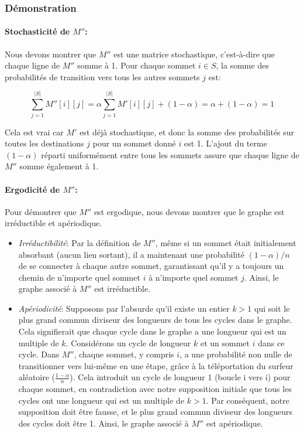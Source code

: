 \subsubsection{Démonstration}

\paragraph{Stochasticité de $M''$:} Nous devons montrer que $M''$ est une matrice stochastique, c'est-à-dire que chaque ligne de $M''$ somme à 1. Pour chaque sommet $i \in S$, la somme des probabilités de transition vers tous les autres sommets $j$ est:

\[
\sum_{j=1}^{|S|} M''[i][j] = \alpha \sum_{j=1}^{|S|} M'[i][j] + (1-\alpha) = \alpha + (1-\alpha) = 1
\]

Cela est vrai car $M'$ est déjà stochastique, et donc la somme des probabilités sur toutes les destinations $j$ pour un sommet donné $i$ est 1. L'ajout du terme $(1-\alpha)$ réparti uniformément entre tous les sommets assure que chaque ligne de $M''$ somme également à 1.

\paragraph{Ergodicité de $M''$:} Pour démontrer que $M''$ est ergodique, nous devons montrer que le graphe est irréductible et apériodique.

\begin{itemize}
    \item \textit{Irréductibilité}: Par la définition de $M''$, même si un sommet était initialement absorbant (aucun lien sortant), il a maintenant une probabilité $(1-\alpha)/n$ de se connecter à chaque autre sommet, garantissant qu'il y a toujours un chemin de n'importe quel sommet $i$ à n'importe quel sommet $j$. Ainsi, le graphe associé à $M''$ est irréductible.
    
    \item \textit{Apériodicité}: Supposons par l'absurde qu'il existe un entier $k > 1$ qui soit le plus grand commun diviseur des longueurs de tous les cycles dans le graphe. Cela signifierait que chaque cycle dans le graphe a une longueur qui est un multiple de $k$. Considérons un cycle de longueur $k$ et un sommet $i$ dans ce cycle. Dans $M''$, chaque sommet, y compris $i$, a une probabilité non nulle de transitionner vers lui-même en une étape, grâce à la téléportation du surfeur aléatoire ($\frac{1-\alpha}{n}$). Cela introduit un cycle de longueur 1 (boucle i vers i) pour chaque sommet, en contradiction avec notre supposition initiale que tous les cycles ont une longueur qui est un multiple de $k > 1$. Par conséquent, notre supposition doit être fausse, et le plus grand commun diviseur des longueurs des cycles doit être 1. Ainsi, le graphe associé à $M''$ est apériodique.

\end{itemize}

